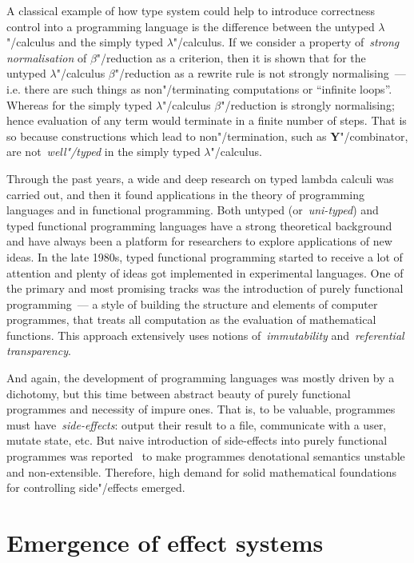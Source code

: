 A classical example of how type system could help to introduce correctness control into
a programming language is the difference between the untyped $\lambda$"/calculus and the simply
typed $\lambda$"/calculus. If we consider a property of~\emph{strong normalisation}
of $\beta$"/reduction as a criterion, then it is shown that for the untyped $\lambda$"/calculus
$\beta$"/reduction as a rewrite rule is not strongly normalising~--- i.e. there are
such things as non"/terminating computations or ``infinite loops''. Whereas
for the simply typed $\lambda$"/calculus $\beta$"/reduction is strongly normalising;
hence evaluation of any term would terminate in a finite number of steps. That is so
because constructions which lead to non"/termination, such as \textbf{Y}"/combinator,
are not~\emph{well"/typed} in the simply typed $\lambda$"/calculus.

Through the past years, a wide and deep research on typed lambda calculi was carried out,
and then it found applications in the theory of programming languages and in
functional programming. Both untyped (or~\emph{uni-typed}) and typed functional programming
languages have a strong theoretical background and have always been a platform for
researchers to explore applications of new ideas. In the late 1980s, typed functional programming
started to receive a lot of attention and plenty of ideas got implemented in experimental
languages. One of the primary and most promising tracks was the introduction of purely
functional programming~--- a style of building the structure and elements of computer
programmes, that treats all computation as the evaluation of mathematical functions. This
approach extensively uses notions of~\emph{immutability} and~\emph{referential transparency}.

And again, the development of programming languages was mostly driven by a dichotomy, but
this time between abstract beauty of purely functional programmes and necessity of impure ones.
That is, to be valuable, programmes must have~\emph{side-effects}: output their result to a file,
communicate with a user, mutate state, etc. But naive introduction of side-effects into
purely functional programmes was reported~\cite{Cartwright1994} to make
programmes denotational semantics unstable and non-extensible. Therefore, high demand for
solid mathematical foundations for controlling side"/effects emerged.

\section{Emergence of effect systems}

